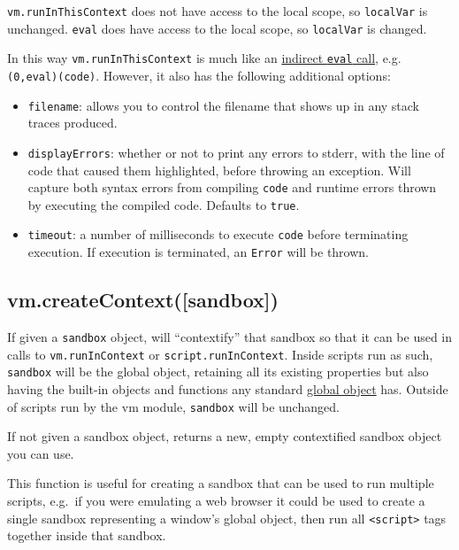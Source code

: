 \texttt{vm.runInThisContext} does not have access to the local scope, so
\texttt{localVar} is unchanged. \texttt{eval} does have access to the
local scope, so \texttt{localVar} is changed.

In this way \texttt{vm.runInThisContext} is much like an
\href{http://es5.github.io/\#x10.4.2}{indirect \texttt{eval} call}, e.g.
\texttt{(0,eval)(\textquotesingle{}code\textquotesingle{})}. However, it
also has the following additional options:

\begin{itemize}
\itemsep1pt\parskip0pt
\item
  \texttt{filename}: allows you to control the filename that shows up in
  any stack traces produced.
\item
  \texttt{displayErrors}: whether or not to print any errors to stderr,
  with the line of code that caused them highlighted, before throwing an
  exception. Will capture both syntax errors from compiling
  \texttt{code} and runtime errors thrown by executing the compiled
  code. Defaults to \texttt{true}.
\item
  \texttt{timeout}: a number of milliseconds to execute \texttt{code}
  before terminating execution. If execution is terminated, an
  \texttt{Error} will be thrown.
\end{itemize}

\subsection{vm.createContext({[}sandbox{]})}\label{vm.createcontextsandbox}

If given a \texttt{sandbox} object, will ``contextify'' that sandbox so
that it can be used in calls to \texttt{vm.runInContext} or
\texttt{script.runInContext}. Inside scripts run as such,
\texttt{sandbox} will be the global object, retaining all its existing
properties but also having the built-in objects and functions any
standard \href{http://es5.github.io/\#x15.1}{global object} has. Outside
of scripts run by the vm module, \texttt{sandbox} will be unchanged.

If not given a sandbox object, returns a new, empty contextified sandbox
object you can use.

This function is useful for creating a sandbox that can be used to run
multiple scripts, e.g.~if you were emulating a web browser it could be
used to create a single sandbox representing a window's global object,
then run all \texttt{\textless{}script\textgreater{}} tags together
inside that sandbox.

